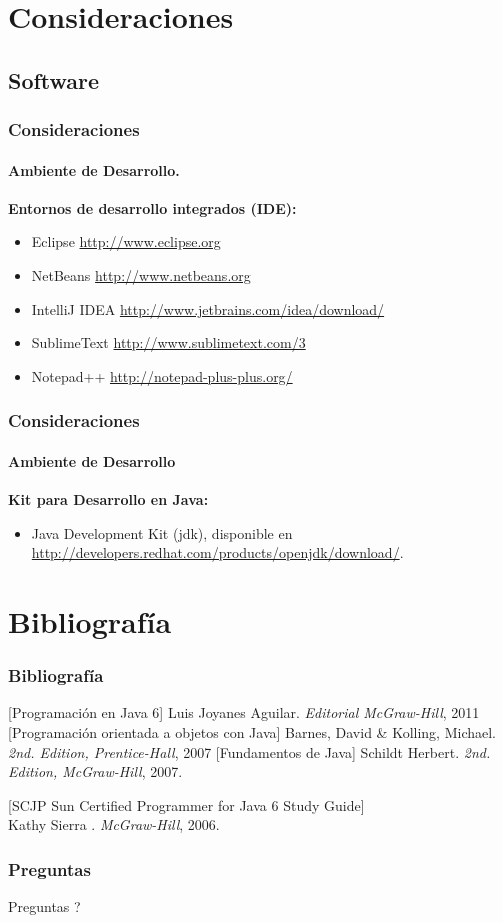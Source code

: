 \documentclass{beamer}
\begin{document}
	\section{Consideraciones}

		\subsection{Software}

		\begin{frame}
			\frametitle{Consideraciones}
			\framesubtitle{Ambiente de Desarrollo.}

			\textbf{Entornos de desarrollo integrados (IDE):}

			\begin{itemize}
				\item Eclipse  \url{http://www.eclipse.org}
				\item NetBeans \url{http://www.netbeans.org}
				\item IntelliJ IDEA  \url{http://www.jetbrains.com/idea/download/}
				\item SublimeText   \url{http://www.sublimetext.com/3}
				\item Notepad++  \url{http://notepad-plus-plus.org/}
			\end{itemize}

		\end{frame}

		\begin{frame}
			\frametitle{Consideraciones}
			\framesubtitle{Ambiente de Desarrollo}

			\textbf{Kit para Desarrollo en Java:}

			\begin{itemize}
				\item Java Development Kit (jdk), disponible en \url{http://developers.redhat.com/products/openjdk/download/}.
			\end{itemize}
		\end{frame}

	\section{Bibliograf\'ia}

		\begin{frame}
			\frametitle{Bibliograf\'ia}

			\begin{thebibliography}{10}
				\beamertemplatebookbibitems
				[Programaci\'on en Java 6] Luis Joyanes Aguilar. \newblock \emph{Editorial McGraw-Hill}, 2011
				[Programaci\'on orientada a objetos con Java] Barnes, David \& Kolling, Michael. \newblock \emph{2nd. Edition, Prentice-Hall}, 2007
				[Fundamentos de Java] Schildt Herbert. \newblock \emph{2nd. Edition, McGraw-Hill}, 2007.

[SCJP Sun Certified Programmer for Java 6 Study Guide]\\ Kathy Sierra . \newblock \emph{ McGraw-Hill}, 2006.
			\end{thebibliography}
		\end{frame}

		\begin{frame}
			\frametitle{Preguntas}

			\hspace{4cm}\huge{Preguntas ?}

		\end{frame}
	
\end{document}

